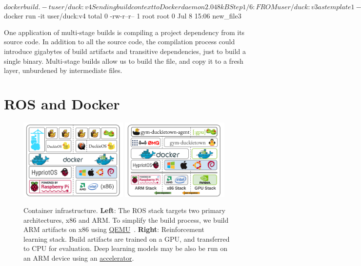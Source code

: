 \documentclass[12pt,initial,twoside,maitrise]{dms}
\numberwithin{equation}{section}
\numberwithin{table}{chapter}
\numberwithin{figure}{chapter}
\begin{document}
\begin{pclisting}
~$ docker build . -t user/duck:v4
Sending build context to Docker daemon  2.048kB
Step 1/6 : FROM user/duck:v3 as template1
--- e3b75ef8ecc4
Step 2/6 : FROM daphne/duck as template2
--- ea2f90g8de9e
Step 3/6 : COPY --from=template1 new_file1 new_file2
---> 72b96668378e
Step 4/6 : FROM donald/duck:v3 as template3
---> e3b75ef8ecc4
Step 5/6 : COPY --from=template2 new_file2 new_file3
---> cb1b84277228
Step 6/6 : CMD ls
---> Running in cb1b84277228
Removing intermediate container cb1b84277228
---> c7dc5dd63e77
Successfully built c7dc5dd63e77
Successfully tagged user/duck:v4
~$ docker run -it user/duck:v4
total 0
-rw-r--r-- 1 root root 0 Jul  8 15:06 new_file3
\end{pclisting}
%
One application of multi-stage builds is compiling a project dependency from its source code. In addition to all the source code, the compilation process could introduce gigabytes of build artifacts and transitive dependencies, just to build a single binary. Multi-stage builds allow us to build the file, and copy it to a fresh layer, unburdened by intermediate files.

\section{ROS and Docker}\label{sec:ros-docker}

\begin{figure}[ht]
    \centering
    \includegraphics[width=0.48\textwidth]{../figures/docker_stack_1.png}
    \includegraphics[width=0.48\textwidth]{../figures/docker_stack_2.png}
    \caption{Container infrastructure. \textbf{Left}: The ROS stack targets two primary architectures, x86 and ARM. To simplify the build process, we build ARM artifacts on x86 using \href{https://www.qemu.org}{QEMU}~\citep{bellard2005qemu}. \textbf{Right}: Reinforcement learning stack. Build artifacts are trained on a GPU, and transferred to CPU for evaluation. Deep learning models may be also be run on an ARM device using an \href{https://software.intel.com/en-us/neural-compute-stick}{accelerator}.}
    \label{fig:docker}
\end{figure}
\end{document}
